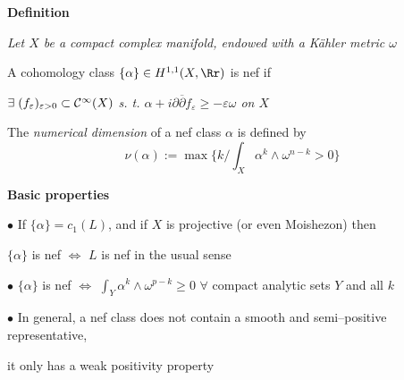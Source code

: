 \begin{slide}

\vskip 10pt
\par\noindent 
{\bf Definition} {\sl Let $X$ be a compact complex manifold, endowed with a K\"ahler metric
$\omega$  

\hskip 1.8cm A cohomology class $\{\alpha\}\in H^{1, 1}(X, {\Rr})$ is nef if } 
\vskip 5pt
\centerline {\sl   
$\exists \hspace{0.1cm} (f_\varepsilon)_{\varepsilon> 0}\subset {\cal C}^{\infty}(X)$ \hskip 0.3cm
s. t. \hskip 0.3cm
$\alpha+ i\partial\overline\partial f_\varepsilon\geq -\varepsilon \omega$ \hskip 0.3cm on 
\hskip 0.3cm$X$}
\vskip 5pt 
\hskip 1.8cm The {\sl numerical dimension} of a nef class ${\alpha}$ is defined by 
$$\nu(\alpha):= \max \{ k / \int_X\alpha^k\wedge\omega^{n- k}> 0\}$$

{\bf Basic properties }

\par\vspace{\bigskipamount}\noindent
$\bullet$ If $\{\alpha\}= c_1(L)$, and if $X$ is projective (or even Moishezon) then 
\vskip 3pt 
\centerline{ $\{\alpha\}$ is nef
  $\iff$ $L$ is nef in the usual sense}
\vskip 3pt
\par\vspace{\bigskipamount}\noindent
$\bullet$ $\{\alpha\}$ is nef $\iff$ $\int_Y\alpha^k\wedge \omega^{p-k}\geq 0$ \hskip 0.3cm 
$\forall$ compact analytic sets $Y$ and all $k$
\vskip 3pt
\par\vspace{\bigskipamount}\noindent
$\bullet$ In general, a nef class does not contain a smooth and semi--positive representative,

\hskip 0.3cm it only has a weak positivity property

\end{slide}


